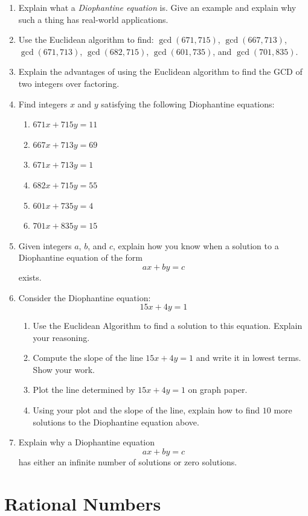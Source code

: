 \newpage
\begin{problems}
\begin{enumerate}
\item Explain what a \textit{Diophantine equation} is. Give an example
  and explain why such a thing has real-world applications.
\item Use the Euclidean algorithm to find: $\gcd(671,715)$,
  $\gcd(667,713)$, $\gcd(671,713)$, $\gcd(682,715)$, $\gcd(601,735)$,
  and $\gcd(701,835)$.
\item Explain the advantages of using the Euclidean algorithm to find
  the GCD of two integers over factoring.
\item Find integers $x$ and $y$ satisfying the following Diophantine
  equations:
\begin{enumerate}
\item $671x + 715 y = 11$ 
\item $667x + 713 y = 69$ 
\item $671x + 713 y = 1$
\item $682x + 715 y = 55$
\item $601x + 735 y = 4$
\item $701x + 835 y = 15$
\end{enumerate}
\item Given integers $a$, $b$, and $c$, explain how you know when a
  solution to a Diophantine equation of the form
\[
ax + by = c
\]
exists.
\item Consider the Diophantine equation:
\[
15x + 4y = 1
\]
\begin{enumerate}
\item Use the Euclidean Algorithm to find a solution to this
  equation. Explain your reasoning.
\item Compute the slope of the line $15x + 4y = 1$ and write it in
  lowest terms. Show your work.
\item Plot the line determined by $15x + 4y = 1$ on graph paper.
\item Using your plot and the slope of the line, explain how to find
  $10$ more solutions to the Diophantine equation above.
\end{enumerate}
\item Explain why a Diophantine equation 
\[
ax + by = c
\]
has either an infinite number of solutions or zero solutions.
\end{enumerate}
\end{problems}



\newpage
\section{Rational Numbers}

